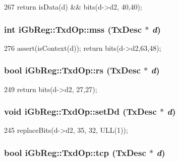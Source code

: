 \begin{DoxyCode}
267 { return isData(d) && bits(d->d2, 40,40); }
\end{DoxyCode}
\hypertarget{namespaceiGbReg_1_1TxdOp_a3c9424fedfd3337a1fbe2fdb133cec01}{
\subsubsection[{mss}]{\setlength{\rightskip}{0pt plus 5cm}int iGbReg::TxdOp::mss (TxDesc $\ast$ {\em d})}}
\label{namespaceiGbReg_1_1TxdOp_a3c9424fedfd3337a1fbe2fdb133cec01}



\begin{DoxyCode}
276 { assert(isContext(d)); return bits(d->d2,63,48); }
\end{DoxyCode}
\hypertarget{namespaceiGbReg_1_1TxdOp_a08af38883baa50a2ca5da9e7575c9e95}{
\subsubsection[{rs}]{\setlength{\rightskip}{0pt plus 5cm}bool iGbReg::TxdOp::rs (TxDesc $\ast$ {\em d})}}
\label{namespaceiGbReg_1_1TxdOp_a08af38883baa50a2ca5da9e7575c9e95}



\begin{DoxyCode}
249 { return bits(d->d2, 27,27); }
\end{DoxyCode}
\hypertarget{namespaceiGbReg_1_1TxdOp_aa4f81d41615115c41fcc39018aaff20e}{
\subsubsection[{setDd}]{\setlength{\rightskip}{0pt plus 5cm}void iGbReg::TxdOp::setDd (TxDesc $\ast$ {\em d})}}
\label{namespaceiGbReg_1_1TxdOp_aa4f81d41615115c41fcc39018aaff20e}



\begin{DoxyCode}
245 { replaceBits(d->d2, 35, 32, ULL(1)); }
\end{DoxyCode}
\hypertarget{namespaceiGbReg_1_1TxdOp_aff380643c92de5f84ae7d6675820723c}{
\subsubsection[{tcp}]{\setlength{\rightskip}{0pt plus 5cm}bool iGbReg::TxdOp::tcp (TxDesc $\ast$ {\em d})}}
\label{namespaceiGbReg_1_1TxdOp_aff380643c92de5f84ae7d6675820723c}



